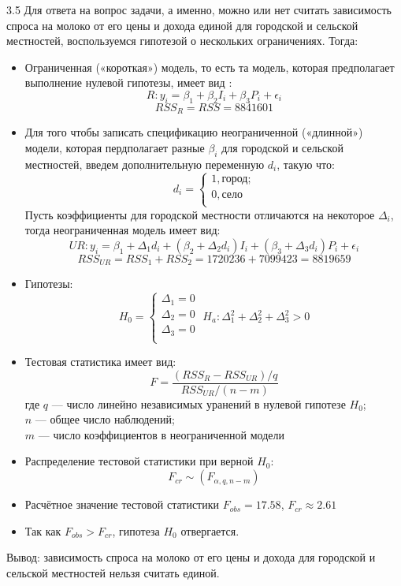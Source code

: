 \begin{solution}{{3.5}}
Для ответа на вопрос задачи, а именно, можно или нет считать зависимость спроса на молоко от его цены и дохода единой для городской и сельской местностей, воспользуемся гипотезой о нескольких ограничениях. Тогда:
\begin{itemize}
\item Ограниченная («короткая») модель, то есть та модель, которая предполагает выполнение нулевой гипотезы, имеет вид :
\[
R: y_i = \beta_1 + \beta_2I_i + \beta_3P_i + \epsilon_i
\]
\[
RSS_R = RSS = 8841601
\]
\item Для того чтобы записать спецификацию неограниченной («длинной») модели, которая пердполагает разные $\beta_i$ для городской и сельской местностей, введем дополнительную переменную $d_i$, такую что:
\[
d_i=
\begin{cases}
1, \text{город;}\\
0, \text{село}\\
\end{cases}
\]
Пусть коэффициенты для городской местности отличаются на некоторое $\Delta_i$, тогда неограниченная модель имеет вид:
\[
UR: y_i = \beta_1+\Delta_1 d_i + (\beta_2+\Delta_2 d_i)I_i + (\beta_3+\Delta_3 d_i)P_i + \epsilon_i
\]
\[
RSS_{UR} = RSS_1 + RSS_2 = 1720236 + 7099423 = 8819659
\]
\item Гипотезы:
\[
H_0=
\begin{cases}
\Delta_1=0\\
\Delta_2=0\\
\Delta_3=0\\
\end{cases} \;
H_a:\Delta_1^2+\Delta_2^2+\Delta_3^2>0
\]
\item Тестовая статистика имеет вид:
\[
F = \frac{(RSS_R-RSS_{UR})/q}{RSS_{UR}/(n-m)}
\]
где $q$ — число линейно независимых уранений в нулевой гипотезе $H_0$;\\
$n$ — общее число наблюдений;\\
$m$ — число коэффициентов в неограниченной модели
\item Распределение тестовой статистики при верной $H_0$:
\[
F_{cr}\sim(F_{\alpha,q,n-m})
\]
\item Расчётное значение тестовой статистики $F_{obs}=17.58$, $F_{cr}\approx 2.61$
\item Так как $F_{obs}>F_{cr}$, гипотеза $H_0$ отвергается.
\end{itemize}
Вывод: зависимость спроса на молоко от его цены и дохода  для городской и сельской местностей нельзя считать единой.
\end{solution}
